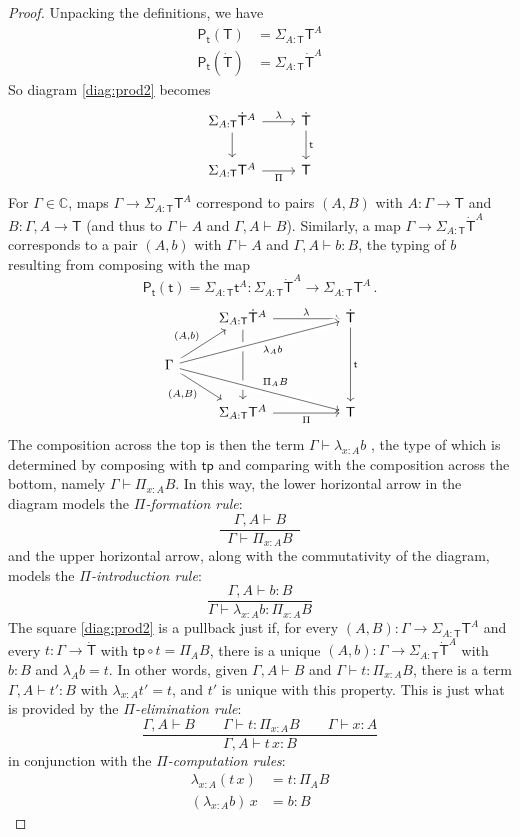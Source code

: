 \documentclass[12pt]{article}
\newcommand{\C}{\ensuremath{\mathbb{C}}}
\newcommand{\tp}{\ensuremath{\mathsf{tp}}}
\newcommand{\alg}[1]{\ensuremath{\mathsf{#1}}}
\renewcommand{\to}{\ensuremath{\rightarrow}}
\newcommand{\G}{\ensuremath{\Gamma}}
\newcommand{\ext}[2]{{#1,#2}}
\renewcommand{\t}{\ensuremath{\mathsf{t}}}
\newcommand{\T}{\ensuremath{\mathsf{T}}}
\newcommand{\TT}{\ensuremath{\dot{\mathsf{T}}}}
\theoremstyle{remark}
\theoremstyle{definition}
\begin{document}
\begin{proof}
Unpacking the definitions, we have 
\begin{align*}
\alg{P}_\t(\T) &= \Sigma_{A:\T} \T^A \\
\alg{P}_\t(\TT) &= \Sigma_{A:\T} \TT^A 
\end{align*}
So diagram \eqref{diag:prod2} becomes
\begin{equation*}%
\begin{tikzcd}
\Sigma_{A:\T} \TT^A \ar[d]  \ar[r, "{\lambda}"] &  \TT \ar[d,"{\t}"] \\
\Sigma_{A:\T} \T^A    \ar[r, swap,"{\Pi}"] & \T
\end{tikzcd}
\end{equation*}
For $\G \in \C$, maps $\G\to \Sigma_{A:\T} \T^A $ correspond to pairs $(A,B)$ with  $A:\G\to \T$ and $B : \ext{\G}{A} \to \T$ (and thus to $\G\vdash A$ and $\ext{\G}{A} \vdash B$). Similarly, a map $\G\to \Sigma_{A:\T} \TT^A $ corresponds to a pair $(A,b)$ with $\G\vdash A$ and $\ext{\G}{A} \vdash b : B$, the typing of $b$ resulting from composing with the map 
\[
\alg{P}_\t(\t) = \Sigma_{A:\T} \t^A : \Sigma_{A:\T} \TT^A \to \Sigma_{A:\T} \T^A\,.
\]
\begin{equation*}%
\begin{tikzcd}
	& \Sigma_{A:\T} \TT^A \ar[dd]  \ar[rr, "{\lambda}"] &&  \TT \ar[dd,"{\t}"] \\
\G \ar[dr,swap, "{(A,B)}"] \ar[ru, "{(A,b)}"] \ar[urrr, swap, crossing over, "{ \lambda_{A}b }"] \ar[drrr, crossing over, "{ \Pi_{A}B }"] &&& \\
 	& \Sigma_{A:\T}\T^A    \ar[rr, swap,"{\Pi}"] && \T 
\end{tikzcd}
\end{equation*}
The composition across the top is then the term $\G \vdash \lambda_{x:A} b$ , the type of which is determined by composing with $\tp$ and comparing with the composition across the bottom, namely $\G \vdash \Pi_{x:A} B$. In this way, the lower horizontal arrow in the diagram models the \emph{$\Pi$-formation rule}:
\[
\frac{\quad\ext{\G}{A}\vdash B\quad}{\G\vdash \Pi_{x:A} B}
\]
and the upper horizontal arrow, along with the commutativity of the diagram, models the \emph{$\Pi$-introduction rule}:
\[
\frac{\ext{\G}{A}\vdash b:B}{\G\vdash \lambda_{x:A} b : \Pi_{x:A} B}
\]
The square \eqref{diag:prod2} is a pullback just if, for every $(A,B) : \G \to \Sigma_{A:\T}\T^A$ and every $t: \G \to \TT$ with $\tp \circ t = \Pi_A B$, there is a unique $(A,b) : \G \to \Sigma_{A:\T}\TT^A$ with $b:B$ and $\lambda_A b = t$.  In other words, given $\ext{\G}{A} \vdash B$ and $\G\vdash t: \Pi_{x:A} B$, there is a term $\ext{\G}{A}\vdash t':B$ with $\lambda_{x:A}  t' = t$, and $t'$ is unique with this property.  This is just what is provided by the \emph{$\Pi$-elimination rule}:
\[
\frac{{\ext{\G}{A} \vdash B}\qquad {\G \vdash t : \Pi_{x:A}  B} \qquad {\G \vdash x:A}}{{\ext{\G}{A}\vdash t\, x :B}}
\]
in conjunction with the \emph{$\Pi$-computation rules}:
\begin{align*}
\lambda_{x:A} (t\,x) &= t : \Pi_A B\\
(\lambda_{x:A} b)\,x &= b : B
\end{align*}
 


\end{proof}
\end{document}
